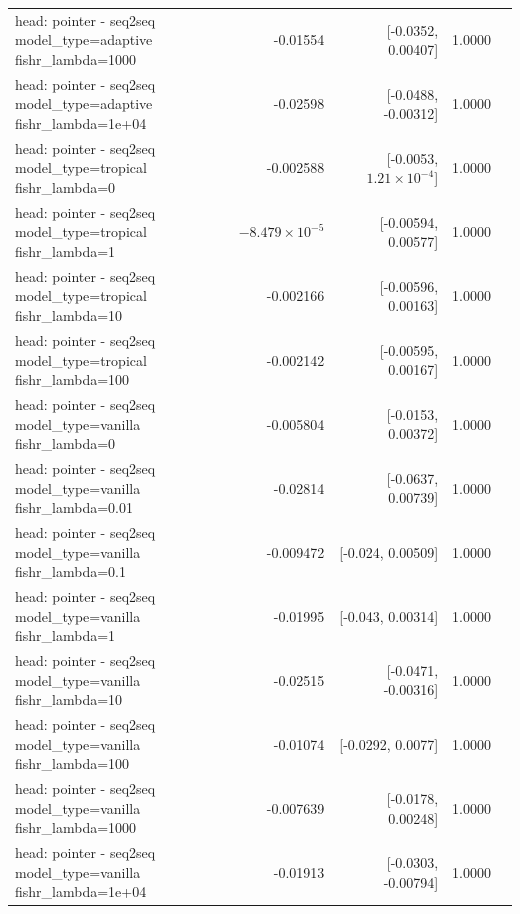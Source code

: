 \documentclass[10pt]{article}
\makeatletter
\newcommand{\stackcell}[1]{\begin{tabular}[t]{@{}l@{}}#1\end{tabular}}
\makeatother
\begin{document}
{\begin{longtable}{lrrrl}
\stackcell{head: pointer - seq2seq\\\footnotesize model\_type=adaptive fishr\_lambda=1000 } & -0.01554 & [-0.0352, 0.00407] & 1.0000 & \\
\stackcell{head: pointer - seq2seq\\\footnotesize model\_type=adaptive fishr\_lambda=1e+04 } & -0.02598 & [-0.0488, -0.00312] & 1.0000 & \\
\stackcell{head: pointer - seq2seq\\\footnotesize model\_type=tropical fishr\_lambda=0 } & -0.002588 & [-0.0053, $1.21\times10^{-4}$] & 1.0000 & \\
\stackcell{head: pointer - seq2seq\\\footnotesize model\_type=tropical fishr\_lambda=1 } & $-8.479\times10^{-5}$ & [-0.00594, 0.00577] & 1.0000 & \\
\stackcell{head: pointer - seq2seq\\\footnotesize model\_type=tropical fishr\_lambda=10 } & -0.002166 & [-0.00596, 0.00163] & 1.0000 & \\
\stackcell{head: pointer - seq2seq\\\footnotesize model\_type=tropical fishr\_lambda=100 } & -0.002142 & [-0.00595, 0.00167] & 1.0000 & \\
\stackcell{head: pointer - seq2seq\\\footnotesize model\_type=vanilla fishr\_lambda=0 } & -0.005804 & [-0.0153, 0.00372] & 1.0000 & \\
\stackcell{head: pointer - seq2seq\\\footnotesize model\_type=vanilla fishr\_lambda=0.01 } & -0.02814 & [-0.0637, 0.00739] & 1.0000 & \\
\stackcell{head: pointer - seq2seq\\\footnotesize model\_type=vanilla fishr\_lambda=0.1 } & -0.009472 & [-0.024, 0.00509] & 1.0000 & \\
\stackcell{head: pointer - seq2seq\\\footnotesize model\_type=vanilla fishr\_lambda=1 } & -0.01995 & [-0.043, 0.00314] & 1.0000 & \\
\stackcell{head: pointer - seq2seq\\\footnotesize model\_type=vanilla fishr\_lambda=10 } & -0.02515 & [-0.0471, -0.00316] & 1.0000 & \\
\stackcell{head: pointer - seq2seq\\\footnotesize model\_type=vanilla fishr\_lambda=100 } & -0.01074 & [-0.0292, 0.0077] & 1.0000 & \\
\stackcell{head: pointer - seq2seq\\\footnotesize model\_type=vanilla fishr\_lambda=1000 } & -0.007639 & [-0.0178, 0.00248] & 1.0000 & \\
\stackcell{head: pointer - seq2seq\\\footnotesize model\_type=vanilla fishr\_lambda=1e+04 } & -0.01913 & [-0.0303, -0.00794] & 1.0000 & \\
\bottomrule
\end{longtable}
}
\end{document}
